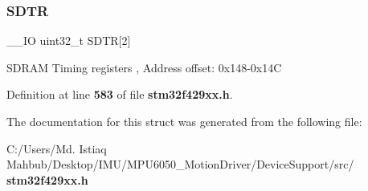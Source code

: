 \mbox{\label{structFMC__Bank5__6__TypeDef_a72abf9d6af975f890224d6856bbba96c}} 
\subsubsection{S\+D\+TR}
{\footnotesize\ttfamily \+\_\+\+\_\+\+IO uint32\+\_\+t S\+D\+TR[2]}

S\+D\+R\+AM Timing registers , Address offset\+: 0x148-\/0x14C 

Definition at line \textbf{ 583} of file \textbf{ stm32f429xx.\+h}.



The documentation for this struct was generated from the following file\+:\begin{DoxyCompactItemize}
\item 
C\+:/\+Users/\+Md. Istiaq Mahbub/\+Desktop/\+I\+M\+U/\+M\+P\+U6050\+\_\+\+Motion\+Driver/\+Device\+Support/src/\textbf{ stm32f429xx.\+h}\end{DoxyCompactItemize}
